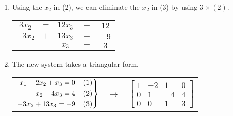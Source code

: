 \documentclass{article}
\newenvironment{rcases}
  {\left.\begin{aligned}}
  {\end{aligned}\right\rbrace}
\begin{document}
\begin{enumerate}
    \item Using the $x_2$ in (2), we can eliminate the $x_2$ in (3) by using $3 \times (2)$.
    \begin{center}
        \begin{tabular}{c c c c c}
            $3x_2$ & $-$ & $12x_3$ & $=$ & $12$ \\
            $-3x_2$ & $+$ & $13x_3$ & $=$ & $-9$ \\
            \hline
            & & $x_3$ & $=$ & $3$ \\
        \end{tabular}
    \end{center}

    \item The new system takes a triangular form.
    \begin{center}
        \begin{tabular}{c c c}

            $\begin{rcases}
            x_1 - 2x_2 + x_3 = 0 \hspace{4mm} (1) \\  
            x_2 - 4x_3 = 4 \hspace{4mm} (2) \\
            -3x_2 + 13x_3 = -9 \hspace{4mm} (3) \\ 
            \end{rcases}$

            & $\rightarrow$ &

            $\begin{bmatrix}
                1 & -2 & 1 & 0 \\
                0 & 1 & -4 & 4 \\
                0 & 0 & 1 & 3
            \end{bmatrix}$

        \end{tabular}
    \end{center}

\end{enumerate}
\end{document}
